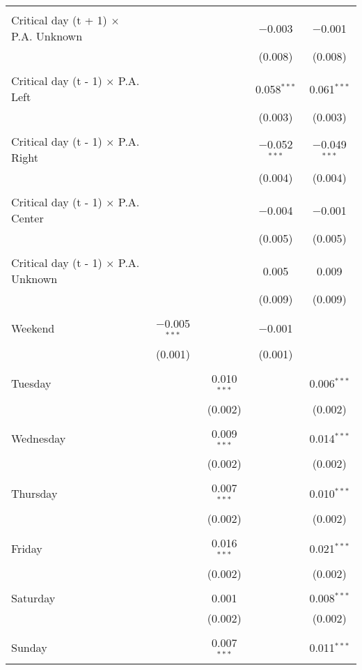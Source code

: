 \documentclass[
]{article}
\begin{document}
\begin{table}[!htbp]
{\begin{tabular}{@{\extracolsep{5pt}}lcccc}
  & & & & \\ 
 Critical day (t + 1) $\times$ P.A. Unknown &  &  & $-$0.003 & $-$0.001 \\ 
  &  &  & (0.008) & (0.008) \\ 
  & & & & \\ 
 Critical day (t - 1) $\times$ P.A. Left &  &  & 0.058$^{***}$ & 0.061$^{***}$ \\ 
  &  &  & (0.003) & (0.003) \\ 
  & & & & \\ 
 Critical day (t - 1) $\times$ P.A. Right &  &  & $-$0.052$^{***}$ & $-$0.049$^{***}$ \\ 
  &  &  & (0.004) & (0.004) \\ 
  & & & & \\ 
 Critical day (t - 1) $\times$ P.A. Center &  &  & $-$0.004 & $-$0.001 \\ 
  &  &  & (0.005) & (0.005) \\ 
  & & & & \\ 
 Critical day (t - 1) $\times$ P.A. Unknown &  &  & 0.005 & 0.009 \\ 
  &  &  & (0.009) & (0.009) \\ 
  & & & & \\ 
 Weekend & $-$0.005$^{***}$ &  & $-$0.001 &  \\ 
  & (0.001) &  & (0.001) &  \\ 
  & & & & \\ 
 Tuesday &  & 0.010$^{***}$ &  & 0.006$^{***}$ \\ 
  &  & (0.002) &  & (0.002) \\ 
  & & & & \\ 
 Wednesday &  & 0.009$^{***}$ &  & 0.014$^{***}$ \\ 
  &  & (0.002) &  & (0.002) \\ 
  & & & & \\ 
 Thursday &  & 0.007$^{***}$ &  & 0.010$^{***}$ \\ 
  &  & (0.002) &  & (0.002) \\ 
  & & & & \\ 
 Friday &  & 0.016$^{***}$ &  & 0.021$^{***}$ \\ 
  &  & (0.002) &  & (0.002) \\ 
  & & & & \\ 
 Saturday &  & 0.001 &  & 0.008$^{***}$ \\ 
  &  & (0.002) &  & (0.002) \\ 
  & & & & \\ 
 Sunday &  & 0.007$^{***}$ &  & 0.011$^{***}$ \\ 

\end{tabular}}
\end{table}
\end{document}
